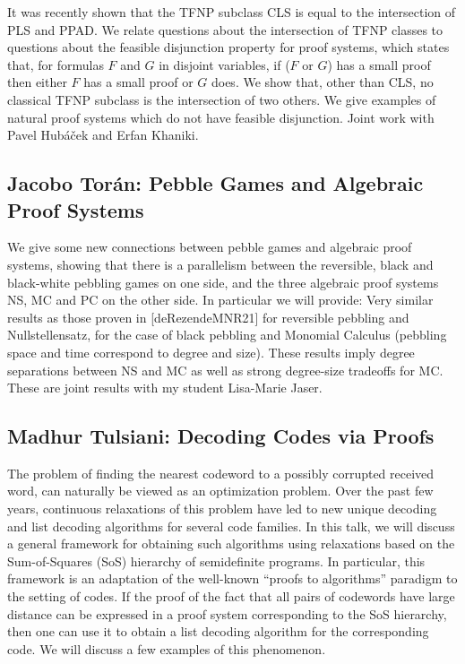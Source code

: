 \documentclass[11pt]{article}
\begin{document}
It was recently shown that the TFNP subclass CLS is equal to the 
intersection of PLS and PPAD. We relate questions about the intersection 
of TFNP classes to questions about the feasible disjunction property for 
proof systems, which states that, for formulas $F$ and $G$ in disjoint 
variables, if ($F$ or $G$) has a small proof then either $F$ has a small proof 
or $G$ does. We show that, other than CLS, no classical TFNP subclass is 
the intersection of two others. We give examples of natural proof 
systems which do not have feasible disjunction. Joint work with Pavel 
Hub\'{a}\v{c}ek and Erfan Khaniki.

\subsection*{Jacobo Tor\'{a}n: Pebble Games and Algebraic Proof Systems}\label{Toran}

We give some new connections between pebble games and algebraic proof systems, showing that there is a parallelism between the reversible, black and black-white pebbling games on one side, and the three algebraic proof systems NS, MC and PC on the other side. In particular we will provide: Very similar results as those proven in [deRezendeMNR21] for reversible pebbling and Nullstellensatz, for the case of black pebbling and Monomial Calculus (pebbling space and time correspond to degree and size). These results imply degree separations between NS and MC as well as strong degree-size tradeoffs for MC. These are joint results with my student Lisa-Marie Jaser.


\subsection*{Madhur Tulsiani: Decoding Codes via Proofs}\label{Tulsiani}

The problem of finding the nearest codeword to a possibly corrupted received word, can naturally be viewed as an optimization problem. Over the past few years, continuous relaxations of this problem have led to new unique decoding and list decoding algorithms for several code families. In this talk, we will discuss a general framework for obtaining such algorithms using relaxations based on the Sum-of-Squares (SoS) hierarchy of semidefinite programs. In particular, this framework is an adaptation of the well-known “proofs to algorithms” paradigm to the setting of codes. If the proof of the fact that all pairs of codewords have large distance can be expressed in a proof system corresponding to the SoS hierarchy, then one can use it to obtain a list decoding algorithm for the corresponding code. We will discuss a few examples of this phenomenon.
\end{document}
